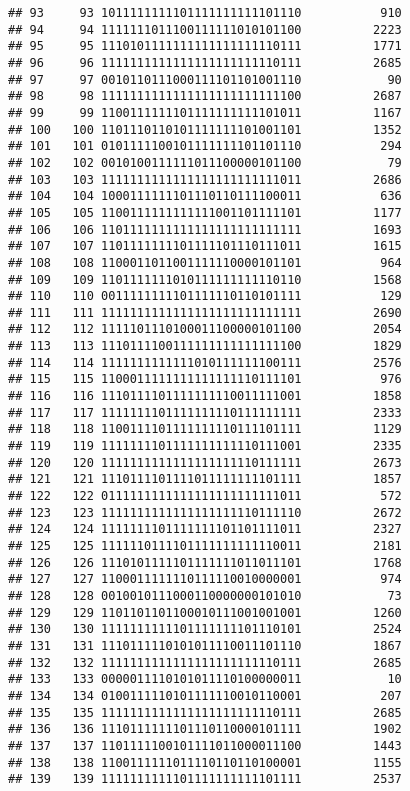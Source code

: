 \documentclass[]{article}
\begin{document}
\begin{verbatim}
## 93     93 1011111111101111111111101110           910
## 94     94 1111111011100111111010101100          2223
## 95     95 1110101111111111111111110111          1771
## 96     96 1111111111111111111111110111          2685
## 97     97 0010110111000111101101001110            90
## 98     98 1111111111111111111111111100          2687
## 99     99 1100111111101111111111101011          1167
## 100   100 1101110110101111111101001101          1352
## 101   101 0101111100101111111101101110           294
## 102   102 0010100111111011100000101100            79
## 103   103 1111111111111111111111111011          2686
## 104   104 1000111111101110110111100011           636
## 105   105 1100111111111111001101111101          1177
## 106   106 1101111111111111111111111111          1693
## 107   107 1101111111101111101110111011          1615
## 108   108 1100011011001111110000101101           964
## 109   109 1101111111010111111111110110          1568
## 110   110 0011111111101111110110101111           129
## 111   111 1111111111111111111111111111          2690
## 112   112 1111101110100011100000101100          2054
## 113   113 1110111100111111111111111100          1829
## 114   114 1111111111111010111111100111          2576
## 115   115 1100011111111111111110111101           976
## 116   116 1110111101111111110011111001          1858
## 117   117 1111111101111111110111111111          2333
## 118   118 1100111101111111110111101111          1129
## 119   119 1111111101111111111110111001          2335
## 120   120 1111111111111111111110111111          2673
## 121   121 1110111101111011111111101111          1857
## 122   122 0111111111111111111111111011           572
## 123   123 1111111111111111111110111110          2672
## 124   124 1111111101111111101101111011          2327
## 125   125 1111110111101111111111110011          2181
## 126   126 1110101111101111111011011101          1768
## 127   127 1100011111110111110010000001           974
## 128   128 0010010111000110000000101010            73
## 129   129 1101101101100010111001001001          1260
## 130   130 1111111111101111111101110101          2524
## 131   131 1110111110101011110011101110          1867
## 132   132 1111111111111111111111110111          2685
## 133   133 0000011110101011110100000011            10
## 134   134 0100111110101111110010110001           207
## 135   135 1111111111111111111111110111          2685
## 136   136 1110111111101110110000101111          1902
## 137   137 1101111100101111011000011100          1443
## 138   138 1100111111011110110110100001          1155
## 139   139 1111111111101111111111101111          2537

\end{verbatim}
\end{document}
